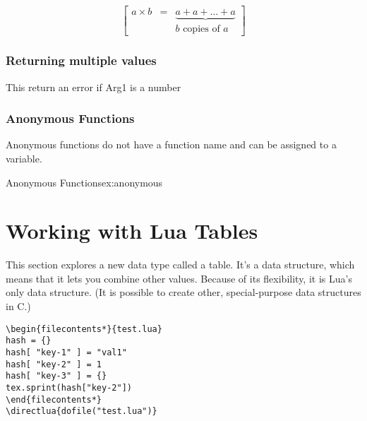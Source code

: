 \[
\begin{bmatrix}
   a\times b & = & \underbrace{a+a+\dots+a} \\
   & & b\mbox{ copies of }a
\end{bmatrix} 
\]


\begin{tcblisting}{}
\end{tcblisting}


\subsection{Returning multiple values}

This return an error if Arg1 is a number
\begin{tcblisting}{}
\end{tcblisting}


\begin{tcblisting}{}
\end{tcblisting}

\subsection{Anonymous Functions}

Anonymous functions do not have a function name and can be assigned to a variable. 

\begin{texexample}{Anonymous Functions}{ex:anonymous}
\end{texexample}

\chapter{Working with Lua Tables}

This section explores a new data type called a table. It's a data structure, which means that it lets
you combine other values. Because of its flexibility, it is Lua’s only data structure. (It is possible to
create other, special-purpose data structures in C.)
\begin{verbatim}
\begin{filecontents*}{test.lua}
hash = {}
hash[ "key-1" ] = "val1"
hash[ "key-2" ] = 1
hash[ "key-3" ] = {}
tex.sprint(hash["key-2"])
\end{filecontents*}
\directlua{dofile("test.lua")}
\end{verbatim}


